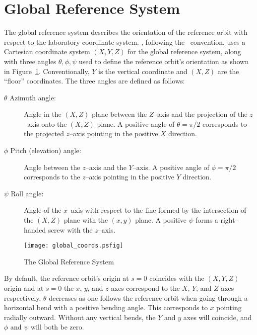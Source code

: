 \section{Global Reference System}
\label{s:global}

The global reference system describes the orientation of the reference
orbit with respect to the laboratory coordinate system.  \bmad,
following the \mad\ convention, uses a Cartesian coordinate system
$(X, Y, Z)$ for the global reference system, along with three angles
$\theta, \phi, \psi$ used to define the reference orbit's orientation
as shown in Figure~\ref{f:global_coords}. Conventionally, $Y$ is the
vertical coordinate and $(X, Z)$ are the ``floor'' coordinates.  The
three angles are defined as follows:
\begin{description}
\item[$\theta$ Azimuth angle:] Angle in the $(X, Z)$ plane 
between the $Z$--axis and the projection of the $z$--axis onto the
$(X, Z)$ plane. A positive angle of $\theta = \pi/2$ corresponds to the
projected $z$--axis pointing in the positive $X$ direction.
\item[$\phi$ Pitch (elevation) angle:] Angle between the $z$--axis 
and the $Y$--axis. A positive angle of $\phi = \pi/2$ corresponds to
the $z$--axis pointing in the positive $Y$ direction.
\item[$\psi$ Roll angle:] Angle of the $x$--axis with respect 
to the line formed by the
intersection of the $(X, Z)$ plane with the $(x, y)$ plane. A
positive $\psi$ forms a right--handed screw with the $z$--axis.
\end{description}

\begin{figure}
\centering
\texttt{[image: global\_coords.psfig]}
\caption{The Global Reference System}
\label{f:global_coords}
\end{figure}

By default, the reference orbit's origin at $s = 0$
coincides with the
$(X, Y, Z)$ origin and at $s = 0$ the $x$, $y$, and $z$ axes
correspond to the $X$, $Y$, and $Z$ axes respectively. $\theta$
decreases as one follows the reference orbit when going through a
horizontal bend with a positive bending angle. This corresponds to $x$
pointing radially outward. Without any vertical bends, the $Y$ and $y$
axes will coincide, and $\phi$ and $\psi$ will both be zero.

\vfill

